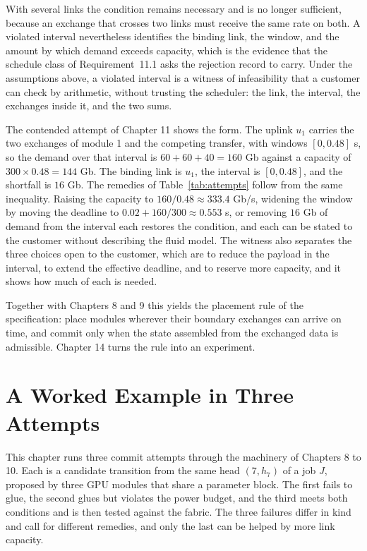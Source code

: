 \documentclass[11pt,openany]{book}
\theoremstyle{remark}
\begin{document}
With several links the condition remains necessary and is no longer sufficient, because an exchange that crosses two links must receive the same rate on both. A violated interval nevertheless identifies the binding link, the window, and the amount by which demand exceeds capacity, which is the evidence that the schedule class of Requirement~11.1 asks the rejection record to carry. Under the assumptions above, a violated interval is a witness of infeasibility that a customer can check by arithmetic, without trusting the scheduler: the link, the interval, the exchanges inside it, and the two sums.

The contended attempt of Chapter 11 shows the form. The uplink $u_1$ carries the two exchanges of module 1 and the competing transfer, with windows $[0,0.48]$ s, so the demand over that interval is $60+60+40=160$ Gb against a capacity of $300\times0.48=144$ Gb. The binding link is $u_1$, the interval is $[0,0.48]$, and the shortfall is $16$ Gb. The remedies of Table~\ref{tab:attempts} follow from the same inequality. Raising the capacity to $160/0.48\approx333.4$ Gb/s, widening the window by moving the deadline to $0.02+160/300\approx0.553$ s, or removing $16$ Gb of demand from the interval each restores the condition, and each can be stated to the customer without describing the fluid model. The witness also separates the three choices open to the customer, which are to reduce the payload in the interval, to extend the effective deadline, and to reserve more capacity, and it shows how much of each is needed.

Together with Chapters 8 and 9 this yields the placement rule of the specification: place modules wherever their boundary exchanges can arrive on time, and commit only when the state assembled from the exchanged data is admissible. Chapter 14 turns the rule into an experiment.

\chapter{A Worked Example in Three Attempts}

This chapter runs three commit attempts through the machinery of Chapters 8 to 10. Each is a candidate transition from the same head $(7,h_7)$ of a job $J$, proposed by three GPU modules that share a parameter block. The first fails to glue, the second glues but violates the power budget, and the third meets both conditions and is then tested against the fabric. The three failures differ in kind and call for different remedies, and only the last can be helped by more link capacity.
\end{document}
